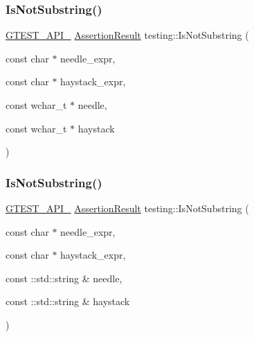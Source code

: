 \subsubsection{\texorpdfstring{IsNotSubstring()}{IsNotSubstring()}\hspace{0.1cm}{\footnotesize\ttfamily [2/3]}}
{\footnotesize\ttfamily \mbox{\hyperlink{gtest-port_8h_aa73be6f0ba4a7456180a94904ce17790}{G\+T\+E\+S\+T\+\_\+\+A\+P\+I\+\_\+}} \mbox{\hyperlink{classtesting_1_1_assertion_result}{Assertion\+Result}} testing\+::\+Is\+Not\+Substring (\begin{DoxyParamCaption}\item[{const char $\ast$}]{needle\+\_\+expr,  }\item[{const char $\ast$}]{haystack\+\_\+expr,  }\item[{const wchar\+\_\+t $\ast$}]{needle,  }\item[{const wchar\+\_\+t $\ast$}]{haystack }\end{DoxyParamCaption})}

\mbox{\label{namespacetesting_a645d822e47dc64b9923e78c880807f12}} 
\subsubsection{\texorpdfstring{IsNotSubstring()}{IsNotSubstring()}\hspace{0.1cm}{\footnotesize\ttfamily [3/3]}}
{\footnotesize\ttfamily \mbox{\hyperlink{gtest-port_8h_aa73be6f0ba4a7456180a94904ce17790}{G\+T\+E\+S\+T\+\_\+\+A\+P\+I\+\_\+}} \mbox{\hyperlink{classtesting_1_1_assertion_result}{Assertion\+Result}} testing\+::\+Is\+Not\+Substring (\begin{DoxyParamCaption}\item[{const char $\ast$}]{needle\+\_\+expr,  }\item[{const char $\ast$}]{haystack\+\_\+expr,  }\item[{const \+::std\+::string \&}]{needle,  }\item[{const \+::std\+::string \&}]{haystack }\end{DoxyParamCaption})}

\mbox{\label{namespacetesting_a5c90a86562b2470213c07742e0eeb0fe}} 
